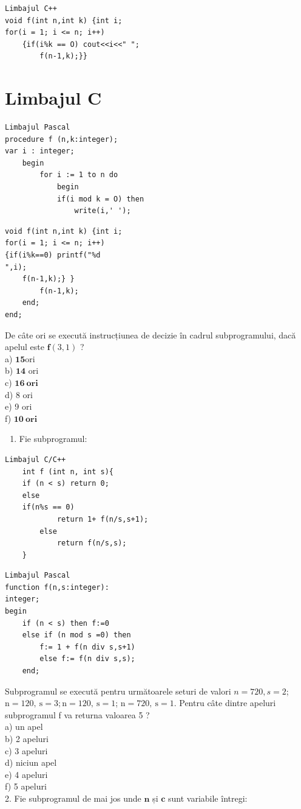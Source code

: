 \documentclass[10pt]{article}
\begin{document}
\begin{verbatim}
Limbajul C++
void f(int n,int k) {int i;
for(i = 1; i <= n; i++)
    {if(i%k == O) cout<<i<<" ";
        f(n-1,k);}}
\end{verbatim}

\section*{Limbajul C}
\begin{verbatim}
Limbajul Pascal
procedure f (n,k:integer);
var i : integer;
    begin
        for i := 1 to n do
            begin
            if(i mod k = O) then
                write(i,' ');
\end{verbatim}

\begin{verbatim}
void f(int n,int k) {int i;
for(i = 1; i <= n; i++)
{if(i%k==0) printf("%d
",i);
    f(n-1,k);} }
        f(n-1,k);
    end;
end;
\end{verbatim}

De câte ori se execută instrucțiunea de decizie în cadrul subprogramului, dacă apelul este $\mathbf{f}(3,1)$ ?\\
a) $\mathbf{1 5} \mathrm{ori}$\\
b) $\mathbf{1 4}$ ori\\
c) $\mathbf{1 6} \mathbf{~ o r i}$\\
d) 8 ori\\
e) 9 ori\\
f) $\mathbf{1 0} \mathbf{~ o r i}$

\begin{enumerate}
  \item Fie subprogramul:
\end{enumerate}

\begin{verbatim}
Limbajul C/C++
    int f (int n, int s){
    if (n < s) return 0;
    else
    if(n%s == 0)
            return 1+ f(n/s,s+1);
        else
            return f(n/s,s);
    }
\end{verbatim}

\begin{verbatim}
Limbajul Pascal
function f(n,s:integer):
integer;
begin
    if (n < s) then f:=0
    else if (n mod s =0) then
        f:= 1 + f(n div s,s+1)
        else f:= f(n div s,s);
    end;
\end{verbatim}

Subprogramul se execută pentru următoarele seturi de valori $n=720, s=2$; $\mathrm{n}=120, \mathrm{~s}=3 ; \mathrm{n}=120, \mathrm{~s}=1$; $\mathrm{n}=720, \mathrm{~s}=1$. Pentru câte dintre apeluri subprogramul f va returna valoarea 5 ?\\
a) un apel\\
b) 2 apeluri\\
c) 3 apeluri\\
d) niciun apel\\
e) 4 apeluri\\
f) 5 apeluri\\
2. Fie subprogramul de mai jos unde $\mathbf{n}$ și $\mathbf{c}$ sunt variabile întregi:
\end{document}
